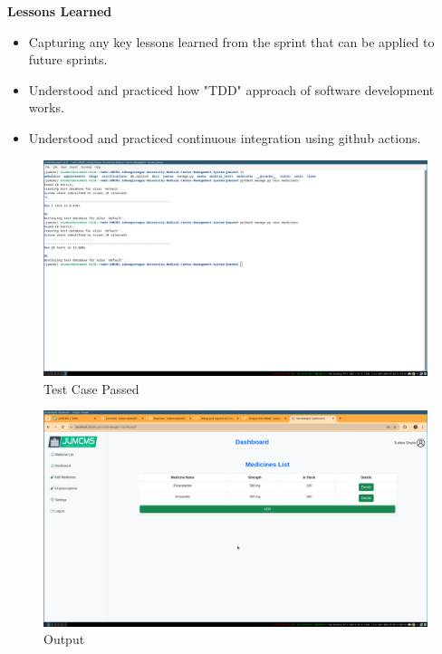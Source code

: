 \documentclass[a4paper,12pt]{article}
\begin{document}
\textbf{Lessons Learned}
\begin{itemize}
    \item Capturing any key lessons learned from the sprint that can be applied to future sprints.

    \item Understood and practiced how "TDD" approach of software development works.
    \item Understood and practiced continuous integration using github actions.
\end{itemize}
\begin{figure}[H]
    \centering
    \includegraphics[width=1\textwidth]{images/meet4test.png}
    \caption{Test Case Passed}
    \label{fig:testcase}
\end{figure}
\begin{figure}[H]
    \centering
    \includegraphics[width=1\textwidth]{images/output1.png}
    \caption{Output}
    \label{fig:output1}
\end{figure}
\end{document}
